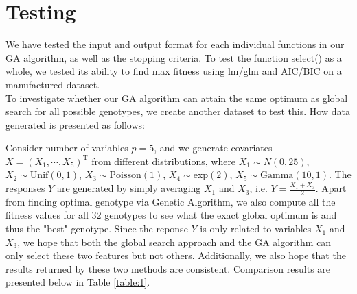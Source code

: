 \documentclass{article}
\def\T{{ \mathrm{\scriptscriptstyle T} }}
\def\T{\mathrm{\scriptstyle T}} %
\begin{document}

\section{Testing}\label{s2}
We have tested the input and output format for each individual functions in our GA algorithm, as well as the stopping criteria. To test the function select() as a whole, we tested its ability to find max fitness using lm/glm and AIC/BIC on a manufactured dataset.\\

\noindent
To investigate whether our GA algorithm can attain the same optimum as global search for all possible genotypes, we create another dataset to test this. How data generated is presented as follows:

\vspace{3mm}
\noindent
Consider number of variables $p=5$, and we generate covariates $X=(X_{1}, \cdots, X_{5})^{\T}$ from different distributions, where $X_{1}\sim N(0,25)$, $X_{2}\sim \mathrm{Unif}(0,1)$, $X_{3}\sim \mathrm{Poisson}(1)$, $X_{4}\sim \mathrm{exp}(2)$, $X_{5}\sim \mathrm{Gamma}(10,1)$. The responses $Y$ are generated by simply averaging $X_{1}$ and $X_{3}$, i.e. $Y=\frac{X_{1}+X_{3}}{2}$. Apart from finding optimal genotype via Genetic Algorithm, we also compute all the fitness values for all 32 genotypes to see what the exact global optimum is and thus the "best" genotype. Since the reponse $Y$ is only related to variables $X_{1}$ and $X_{3}$, we hope that both the global search approach and the GA algorithm can only select these two features but not others. Additionally, we also hope that the results returned by these two methods are consistent. Comparison results are presented below in Table \ref{table:1}.
\end{document}
